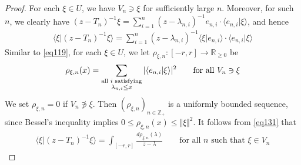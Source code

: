 \documentclass[12pt,b5paper,notitlepage]{article}
\theoremstyle{definition}
\theoremstyle{plain}
\newcommand{\bk}[1]{\langle {#1}\rangle}
\newcommand{\Zbb}{\mathbb Z}
\newcommand{\Rbb}{\mathbb R}
\numberwithin{equation}{section}
\begin{document}
\begin{proof}
For each $\xi\in U$, we have $V_n\ni\xi$ for sufficiently large $n$. Moreover, for such $n$, we clearly have $(z-T_n)^{-1}\xi=\sum_{i=1}^n(z-\lambda_{n,i})^{-1}e_{n,i}\cdot\bk{e_{n,i}|\xi}$, and hence
\begin{align}\label{eq131}
\bk{\xi|(z-T_n)^{-1}\xi}=\sum_{i=1}^n (z-\lambda_{n,i})^{-1}\bk{\xi|e_{n,i}}\cdot \bk{e_{n,i}|\xi}
\end{align}
Similar to \eqref{eq119}, for each $\xi\in U$, we let $\rho_{\xi,n}:[-r,r]\rightarrow\Rbb_{\geq0}$ be
\begin{align}
\rho_{\xi,n}(x)=\sum_{
\begin{subarray}{c}
\text{all $i$ satisfying}\\
\lambda_{n,i}\leq x
\end{subarray}
}|\bk{e_{n,i}|\xi}|^2
\qquad\text{for all }V_n\ni\xi
\end{align}
We set $\rho_{\xi,n}=0$ if $V_n\notni\xi$. Then $(\rho_{\xi,n})_{n\in\Zbb_+}$ is a uniformly bounded sequence, since Bessel's inequality implies $0\leq\rho_{\xi,n}(x)\leq\Vert\xi\Vert^2$. It follows from \eqref{eq131} that
\begin{align*}
\bk{\xi|(z-T_n)^{-1}\xi}=\int_{[-r,r]}\frac{d\rho_{\xi,n}(\lambda)}{z-\lambda}\qquad\text{for all $n$ such that }\xi\in V_n
\end{align*}





\end{proof}
\end{document}
